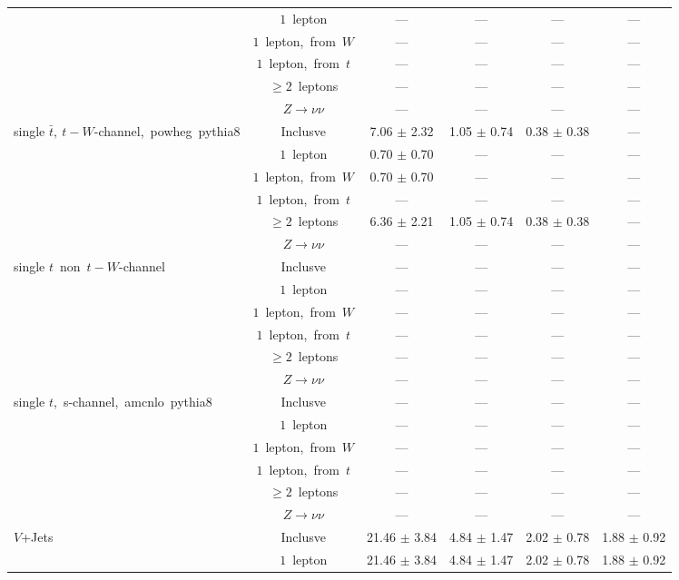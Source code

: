 \documentclass{article}
\begin{document}
\begin{longtable}{|l|c|c|c|c|c|}
 & $1$~lepton  & ---  & ---  & ---  & --- \\* 
 & $1$~lepton,~from~$W$  & ---  & ---  & ---  & --- \\* 
 & $1$~lepton,~from~$t$  & ---  & ---  & ---  & --- \\* 
 & $\ge2$~leptons  & ---  & ---  & ---  & --- \\* 
 & $Z\rightarrow\nu\nu$  & ---  & ---  & ---  & --- \\* 
\hline 
\multirow{6}{*}{single $\bar{t},~t-W$-channel,~powheg~pythia8} & Inclusve  & 7.06 $\pm$ 2.32  & 1.05 $\pm$ 0.74  & 0.38 $\pm$ 0.38  & --- \\* 
 & $1$~lepton  & 0.70 $\pm$ 0.70  & ---  & ---  & --- \\* 
 & $1$~lepton,~from~$W$  & 0.70 $\pm$ 0.70  & ---  & ---  & --- \\* 
 & $1$~lepton,~from~$t$  & ---  & ---  & ---  & --- \\* 
 & $\ge2$~leptons  & 6.36 $\pm$ 2.21  & 1.05 $\pm$ 0.74  & 0.38 $\pm$ 0.38  & --- \\* 
 & $Z\rightarrow\nu\nu$  & ---  & ---  & ---  & --- \\* 
\hline 
\multirow{6}{*}{single $t$~non~$t-W$-channel} & Inclusve  & ---  & ---  & ---  & --- \\* 
 & $1$~lepton  & ---  & ---  & ---  & --- \\* 
 & $1$~lepton,~from~$W$  & ---  & ---  & ---  & --- \\* 
 & $1$~lepton,~from~$t$  & ---  & ---  & ---  & --- \\* 
 & $\ge2$~leptons  & ---  & ---  & ---  & --- \\* 
 & $Z\rightarrow\nu\nu$  & ---  & ---  & ---  & --- \\* 
\hline 
\multirow{6}{*}{single $t$,~s-channel,~amcnlo~pythia8} & Inclusve  & ---  & ---  & ---  & --- \\* 
 & $1$~lepton  & ---  & ---  & ---  & --- \\* 
 & $1$~lepton,~from~$W$  & ---  & ---  & ---  & --- \\* 
 & $1$~lepton,~from~$t$  & ---  & ---  & ---  & --- \\* 
 & $\ge2$~leptons  & ---  & ---  & ---  & --- \\* 
 & $Z\rightarrow\nu\nu$  & ---  & ---  & ---  & --- \\* 
\hline 
\multirow{6}{*}{$V$+Jets} & Inclusve  & 21.46 $\pm$ 3.84  & 4.84 $\pm$ 1.47  & 2.02 $\pm$ 0.78  & 1.88 $\pm$ 0.92 \\* 
 & $1$~lepton  & 21.46 $\pm$ 3.84  & 4.84 $\pm$ 1.47  & 2.02 $\pm$ 0.78  & 1.88 $\pm$ 0.92 \\* 

\end{longtable}
\end{document}

